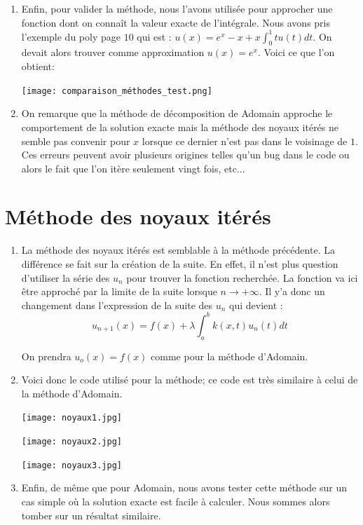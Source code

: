 \documentclass{article}
\begin{document}
\begin{enumerate}
\item Enfin, pour valider la méthode, nous l'avons utilisée pour approcher une fonction dont on connaît la valeur exacte de l'intégrale. Nous avons pris l'exemple du poly page $10$ qui est : $u(x)=e^x-x+x\displaystyle\int^1_0tu(t)dt$. On devait alors trouver comme approximation $u(x)=e^x$. Voici ce que l'on obtient:
{
\texttt{[image: comparaison\_méthodes\_test.png]} \par}
\bigskip

\item On remarque que la méthode de décomposition de Adomain approche le comportement de la solution exacte mais la méthode des noyaux itérés ne semble pas convenir pour $x$ lorsque ce dernier n'est pas dans le voisinage de $1$. Ces erreurs peuvent avoir plusieurs origines telles qu'un bug dans le code ou alors le fait que l'on itère seulement vingt fois, etc...

\end{enumerate}


\section{Méthode des noyaux itérés}

\begin{enumerate}
    \item La méthode des noyaux itérés est semblable à la méthode précédente. La différence se fait sur la création de la suite. En effet, il n'est plus question d'utiliser la série des $u_n$ pour trouver la fonction recherchée. La fonction va ici être approché par la limite de la suite lorsque $n\longrightarrow +\infty$. Il y'a donc un changement dans l'expression de la suite des $u_n$ qui devient :\\
    $$u_{n+1}(x)=f(x) + \lambda \displaystyle\int_{a}^{b} k(x,t)u_n(t)dt$$ 

    On prendra $u_o(x)=f(x)$ comme pour la méthode d'Adomain.

    \item Voici donc le code utilisé pour la méthode; ce code est très similaire à celui de la méthode d'Adomain.\\

    {
\texttt{[image: noyaux1.jpg]} \par}
\bigskip

{
\texttt{[image: noyaux2.jpg]} \par}
\bigskip



    {
\texttt{[image: noyaux3.jpg]} \par}
\bigskip

    \item Enfin, de même que pour Adomain, nous avons tester cette méthode sur un cas simple où la solution exacte est facile à calculer. Nous sommes alors tomber sur un résultat similaire.


\end{enumerate}
\end{document}
